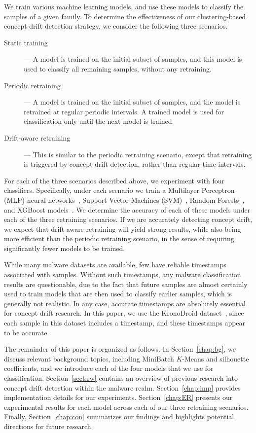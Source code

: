 \documentclass[12pt]{article}
\begin{document}
We train various machine learning models, and use these models to 
classify the samples of a given family. To determine the effectiveness of our 
clustering-based concept drift detection strategy, we consider
the following three scenarios.
\begin{description}
\item[Static training]--- A model is trained on the initial subset of samples, 
and this model is used to classify all remaining
samples, without any retraining.
\item[Periodic retraining]--- A model is trained on the initial subset of samples, and the
model is retrained at regular periodic intervals. A trained model is
used for classification only until the next model is trained.
\item[Drift-aware retraining]--- This is similar to the periodic retraining scenario, 
except that retraining is 
triggered by concept drift detection, rather than regular time intervals.
\end{description}

For each of the three scenarios described above, we experiment with four classifiers. 
Specifically, under each scenario we train  
a Multilayer Perceptron (MLP) neural networks~\cite{scikit-learn_mlp_classifier}, 
Support Vector Machines (SVM)~\cite{scikit-learn_linear_svc}, 
Random Forests~\cite{scikit-learn_random_forest_classifier}, 
and XGBoost models~\cite{xgboost_sklearn_estimator}. We determine the 
accuracy of each of these models under each of the three retraining scenarios.
If we are accurately detecting concept drift, we expect that drift-aware 
retraining will yield strong results, while also being more efficient than
the periodic retraining scenario, in the sense of requiring significantly 
fewer models to be trained.

While many malware datasets are available, few have reliable timestamps associated with 
samples. Without such timestamps, any malware classification results are questionable, due to the
fact that future samples are almost certainly used to train models that are then used
to classify earlier samples, which is
generally not realistic. In any case, accurate timestamps are absolutely essential
for concept drift research. In this paper, we use the KronoDroid dataset~\cite{Krono}, 
since each sample in this dataset includes a timestamp,
and these timestamps appear to be accurate.

The remainder of this paper is organized as follows. In Section~\ref{chap:bg}, 
we discuss relevant background topics, including 
MiniBatch $K$-Means and silhouette coefficients, 
and we introduce each of the
four models that we use for classification.
Section~\ref{sect:rw} contains an overview of 
previous research into concept drift detection within the malware realm. 
Section~\ref{chap:imp} provides implementation details for our experiments. 
Section~\ref{chap:ER} presents our experimental results for 
each model across each of our three retraining scenarios. 
Finally, Section~\ref{chap:con} summarizes 
our findings and highlights potential directions for future research.
\end{document}
